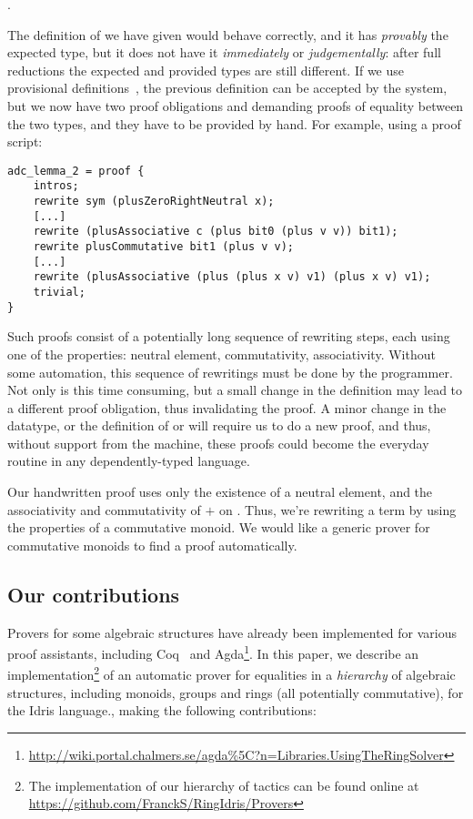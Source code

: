 .

The definition of  we have given would behave correctly, and it has
\emph{provably} the expected type, but it does not have it \emph{immediately}
or \emph{judgementally}: after full reductions the expected and provided types are still
different.
If we use provisional definitions~\cite{DBLP:conf/plpv/Brady13}, the previous
definition can be accepted by the system, but we now have two proof obligations
 and  demanding proofs of equality
between the two types, and they have to be provided by hand.
For example, using a proof script: 

\begin{lstlisting}
adc_lemma_2 = proof {
    intros;
    rewrite sym (plusZeroRightNeutral x);
    [...]
    rewrite (plusAssociative c (plus bit0 (plus v v)) bit1);
    rewrite plusCommutative bit1 (plus v v);
    [...]
    rewrite (plusAssociative (plus (plus x v) v1) (plus x v) v1);
    trivial;
}
\end{lstlisting}

Such proofs consist of a potentially long sequence of
rewriting steps, each using one of the properties: neutral element,
commutativity, associativity. Without some automation, this sequence of
rewritings must be done by the programmer.  Not only is this time consuming,
but a small change in the definition may lead to a different proof obligation,
thus invalidating the proof. 
A minor change in the datatype, or 
the definition of  or  will require us
to do a new proof, and thus, without support from the machine, these
proofs
could become the everyday routine in any dependently-typed language.

Our handwritten proof uses only the existence of a neutral
element, and the associativity and commutativity of $+$ on . Thus,
we're rewriting a term by using the properties of a commutative monoid. We
would like a generic prover for commutative monoids to find a proof 
automatically.

\subsection{Our contributions}

Provers for some algebraic structures have already been implemented for various
proof assistants, including Coq~\cite{Coq2005} and
Agda\footnote{\url{http://wiki.portal.chalmers.se/agda\%5C?n=Libraries.UsingTheRingSolver}}. 
In this paper, we describe an implementation\footnote{The
implementation of our hierarchy of tactics can be found online at
\url{https://github.com/FranckS/RingIdris/Provers}} of an automatic prover for
equalities in a \emph{hierarchy} of algebraic structures, including monoids,
groups and rings (all potentially commutative), for the Idris language.,
making the following contributions:

